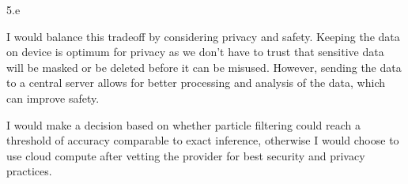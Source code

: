 \LARGE
5.e
\normalsize

\begin{answer}
  I would balance this tradeoff by considering privacy and safety. Keeping the data on device is optimum for privacy as we don't have to trust that sensitive data will be masked or be deleted before it can be misused. However, sending the data to a central server allows for better processing and analysis of the data, which can improve safety.
  
  I would make a decision based on whether particle filtering could reach a threshold of accuracy comparable to exact inference, otherwise I would choose to use cloud compute after vetting the provider for best security and privacy practices.
\end{answer}
\clearpage



